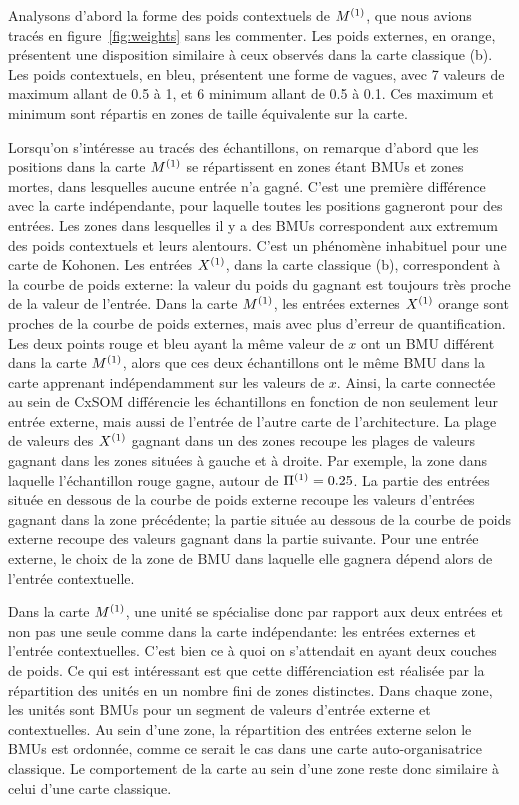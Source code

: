 Analysons d'abord la forme des poids contextuels de $M^{({1})}$, que nous avions tracés en figure~\ref{fig:weights} sans les commenter. Les poids externes, en orange, présentent une disposition similaire à ceux observés dans la carte classique (b). Les poids contextuels, en bleu, présentent une forme de vagues, avec 7 valeurs de maximum allant de 0.5 à 1, et 6 minimum allant de 0.5 à 0.1. Ces maximum et minimum sont répartis en zones de taille équivalente sur la carte. 

Lorsqu'on s'intéresse au tracés des échantillons, on remarque d'abord que les positions dans la carte $M^{({1})}$ se répartissent en zones étant BMUs et zones mortes, dans lesquelles aucune entrée n'a gagné. C'est une première différence avec la carte indépendante, pour laquelle toutes les positions gagneront pour des entrées. Les zones dans lesquelles il y a des BMUs correspondent aux extremum des poids contextuels et leurs alentours. C'est un phénomène inhabituel pour une carte de Kohonen. Les entrées $X^{({1})}$, dans la carte classique (b), correspondent à la courbe de poids externe: la valeur du poids du gagnant est toujours très proche de la valeur de l'entrée. Dans la carte $M^{({1})}$, les entrées externes $X^{({1})}$ orange sont proches de la courbe de poids externes, mais avec plus d'erreur de quantification.
Les deux points rouge et bleu ayant la même valeur de $x$ ont un BMU différent dans la carte $M^{({1})}$, alors que ces deux échantillons ont le même BMU dans la carte apprenant indépendamment sur les valeurs de $x$. Ainsi, la carte connectée au sein de CxSOM différencie les échantillons en fonction de non seulement leur entrée externe, mais aussi de l'entrée de l'autre carte de l'architecture. La plage de valeurs des $X^{({1})}$ gagnant dans un des zones recoupe les plages de valeurs gagnant dans les zones situées à gauche et à droite. Par exemple, la zone dans laquelle l'échantillon rouge gagne, autour de $\Pi^{({1})} = 0.25$. La partie des entrées située en dessous de la courbe de poids externe recoupe les valeurs d'entrées gagnant dans la zone précédente; la partie située au dessous de la courbe de poids externe recoupe des valeurs gagnant dans la partie suivante. Pour une entrée externe, le choix de la zone de BMU dans laquelle elle gagnera dépend alors de l'entrée contextuelle. 


Dans la carte $M^{({1})}$, une unité se spécialise donc par rapport aux deux entrées et non pas une seule comme dans la carte indépendante: les entrées externes et l'entrée contextuelles. C'est bien ce à quoi on s'attendait en ayant deux couches de poids. Ce qui est intéressant est que cette différenciation est réalisée par la répartition des unités en un nombre fini de zones distinctes. Dans chaque zone, les unités sont BMUs pour un segment de valeurs d'entrée externe et contextuelles. Au sein d'une zone, la répartition des entrées externe selon le BMUs est ordonnée, comme ce serait le cas dans une carte auto-organisatrice classique. Le comportement de la carte au sein d'une zone reste donc similaire à celui d'une carte classique.

